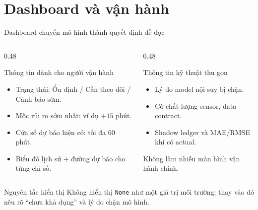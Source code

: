 \section{Dashboard và vận hành}

\begin{frame}{Dashboard chuyển mô hình thành quyết định dễ đọc}
  \begin{columns}[T]
    \begin{column}{0.48\textwidth}
      \begin{block}{Thông tin dành cho người vận hành}
        \begin{itemize}
          \item Trạng thái: Ổn định / Cần theo dõi / Cảnh báo sớm.
          \item Mốc rủi ro sớm nhất: ví dụ $+15$ phút.
          \item Cửa sổ dự báo hiện có: tối đa 60 phút.
          \item Biểu đồ lịch sử + đường dự báo cho từng chỉ số.
        \end{itemize}
      \end{block}
    \end{column}
    \begin{column}{0.48\textwidth}
      \begin{exampleblock}{Thông tin kỹ thuật thu gọn}
        \begin{itemize}
          \item Lý do model nội suy bị chặn.
          \item Cờ chất lượng sensor, data contract.
          \item Shadow ledger và MAE/RMSE khi có actual.
        \end{itemize}
        Không làm nhiễu màn hình vận hành chính.
      \end{exampleblock}
    \end{column}
  \end{columns}
  \vspace{0.4em}
  \begin{alertblock}{Nguyên tắc hiển thị}
    Không hiển thị \texttt{None} như một giá trị môi trường; thay vào đó nêu rõ
    ``chưa khả dụng'' và lý do chặn mô hình.
  \end{alertblock}
\end{frame}


